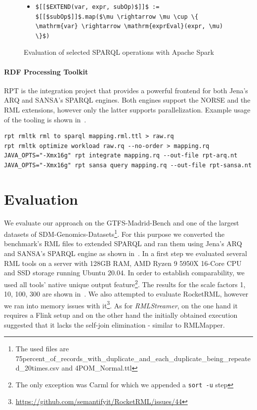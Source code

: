 \begin{figure}[htb]
\begin{itemize}
\item \begin{lstlisting}[mathescape=true]
$[[$EXTEND(var, expr, subOp)$]]$ := $[[$subOp$]]$.map($\mu \rightarrow \mu \cup \{ \mathrm{var} \rightarrow \mathrm{exprEval}(expr, \mu) \}$)
\end{lstlisting}
\end{itemize}
\vspace*{-5mm}
\caption{Evaluation of selected SPARQL operations with Apache Spark}
\label{lst:sparql-to-spark} 
\end{figure}

\paragraph{RDF Processing Toolkit} RPT is the integration project that provides a powerful frontend for both Jena's ARQ and SANSA's SPARQL engines. Both engines support the NORSE and the RML extensions, however only the latter supports parallelization. Example usage of the tooling is shown in~.

\begin{lstlisting}[label=lst:usage, basicstyle=\footnotesize, caption=Example for using RPT to translate and execute RML]
rpt rmltk rml to sparql mapping.rml.ttl > raw.rq
rpt rmltk optimize workload raw.rq --no-order > mapping.rq
JAVA_OPTS="-Xmx16g" rpt integrate mapping.rq --out-file rpt-arq.nt
JAVA_OPTS="-Xmx16g" rpt sansa query mapping.rq --out-file rpt-sansa.nt
\end{lstlisting}


\section{Evaluation}
\label{sec:eval}
We evaluate our approach on the GTFS-Madrid-Bench and one of the largest datasets of SDM-Genomics-Datasets\footnote{The used files are 75percent\_of\_records\_with\_duplicate\_and\_each\_duplicate\_being\_repeated\_20times.csv and 4POM\_Normal.ttl}.
For this purpose we converted the benchmark's RML files to extended SPARQL and ran them using Jena's ARQ and SANSA's SPARQL engine as shown in~.
In a first step we evaluated several RML tools on a server with 128GB RAM, AMD Ryzen 9 5950X 16-Core CPU and SSD storage running Ubuntu 20.04.
In order to establish comparability, we used all tools' native unique output feature\footnote{The only exception was Carml for which we appended a \texttt{sort -u} step}. The results for the scale factors 1, 10, 100, 300 are shown in~.
We also attempted to evaluate RocketRML, however we ran into memory issues with it\footnote{\url{https://github.com/semantifyit/RocketRML/issues/44}}.
As for \emph{RMLStreamer}\cite{Haesendonck2019}, on the one hand it requires a Flink setup and on the other hand the initially obtained execution suggested that it lacks the self-join elimination - similar to RMLMapper.

